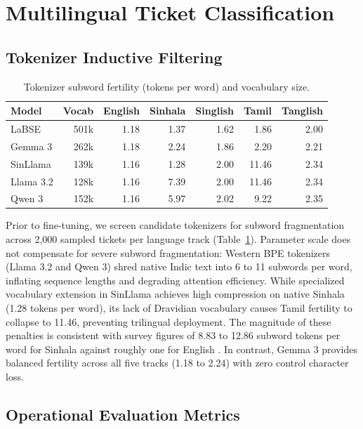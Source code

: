 \section{Multilingual Ticket Classification}
\label{sec:classifiers}

\subsection{Tokenizer Inductive Filtering}

\begin{table}[!htbp]
\caption{Tokenizer subword fertility (tokens per word) and vocabulary size.}
\label{tab:tokenizer_fertility}
\centering
\small
\setlength{\tabcolsep}{2.8pt}
\begin{tabular}{@{}lrrrrrr@{}}
\toprule
Model & Vocab & English & Sinhala & Singlish & Tamil & Tanglish \\
\midrule
LaBSE & 501k & 1.18 & 1.37 & 1.62 & 1.86 & 2.00 \\
Gemma 3 & 262k & 1.18 & 2.24 & 1.86 & 2.20 & 2.21 \\
SinLlama & 139k & 1.16 & 1.28 & 2.00 & 11.46 & 2.34 \\
Llama 3.2 & 128k & 1.16 & 7.39 & 2.00 & 11.46 & 2.34 \\
Qwen 3 & 152k & 1.16 & 5.97 & 2.02 & 9.22 & 2.35 \\
\bottomrule
\end{tabular}
\end{table}

Prior to fine-tuning, we screen candidate tokenizers for subword fragmentation across 2{,}000 sampled tickets per language track (Table~\ref{tab:tokenizer_fertility}). Parameter scale does not compensate for severe subword fragmentation: Western BPE tokenizers (Llama 3.2 and Qwen 3) shred native Indic text into 6 to 11 subwords per word, inflating sequence lengths and degrading attention efficiency. While specialized vocabulary extension in SinLlama \cite{aravinda2025sinllama} achieves high compression on native Sinhala (1.28 tokens per word), its lack of Dravidian vocabulary causes Tamil fertility to collapse to 11.46, preventing trilingual deployment. The magnitude of these penalties is consistent with survey figures of 8.83 to 12.86 subword tokens per word for Sinhala against roughly one for English \cite{desilva2019sinhalasurvey}. In contrast, Gemma 3 provides balanced fertility across all five tracks (1.18 to 2.24) with zero control character loss.

\subsection{Operational Evaluation Metrics}


